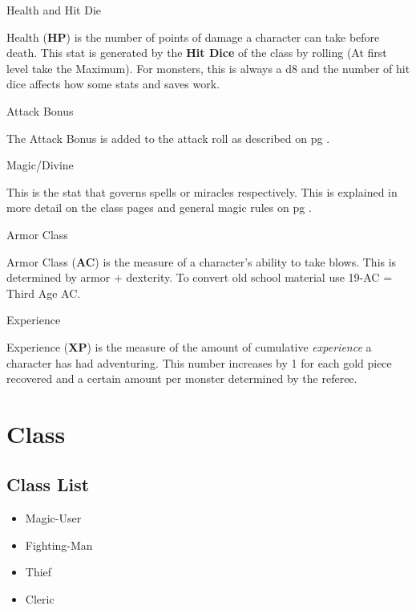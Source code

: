 \documentclass[18pt]{article}
\begin{document}
\begin{multicols}{2}
\begin{mercHeading}
Health and Hit Die
\end{mercHeading}
Health (\textbf{HP}) is the number of points of damage a character can take before death. This stat is generated by the \textbf{Hit Dice} of the class by rolling (At first level take the Maximum). For monsters, this is always a d8 and the number of hit dice affects how some stats and saves work.

\begin{mercHeading}
Attack Bonus
\end{mercHeading}
The Attack Bonus is added to the attack roll as described on pg \pageref{label:atkroll}.

\begin{mercHeading}
Magic/Divine
\end{mercHeading}
This is the stat that governs spells or miracles respectively. This is explained in more detail on the class pages and general magic rules on pg \pageref{section:GenMagicRules}.

\begin{mercHeading}
Armor Class
\end{mercHeading}
Armor Class (\textbf{AC}) is the measure of a character's ability to take blows. This is determined by armor + dexterity. To convert old school material use 19-AC = Third Age AC.

\begin{mercHeading}
Experience
\end{mercHeading}
Experience (\textbf{XP}) is the measure of the amount of cumulative \emph{experience} a character has had adventuring. This number increases by 1 for each gold piece recovered and a certain amount per monster determined by the referee.
\section*{Class}
\subsection*{Class List}
\label{label:Class}
\begin{itemize}
	\item Magic-User
	\item Fighting-Man
	\item Thief
	\item Cleric
\end{itemize}

\end{multicols}
\end{document}
